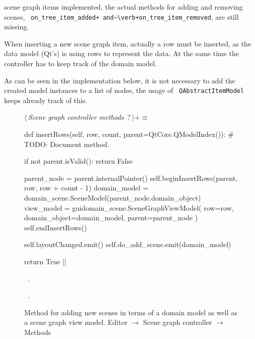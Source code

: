 \documentclass[%
    a4paper,    %
    justified,  %
    nobib,      %
    openany     %
]{tufte-book}
\begin{document}
 scene
graph items implemented, the actual methods for adding and removing scenes,
~\verb=on_tree_item_added+ and~\verb+on_tree_item_removed=, are still missing.

When inserting a new scene graph item, actually a row must be inserted, as the
data model (Qt's) is using rows to represent the data. At the same time the
controller has to keep track of the domain model.

As can be seen in the implementation below, it is not necessary to add the
created model instances to a list of nodes, the usage of
~\verb=QAbstractItemModel= keeps already track of this.

\begin{figure}
\begin{flushleft} \small
\begin{minipage}{\linewidth}\label{scrap51}\raggedright\small
{} $\langle\,${\itshape Scene graph controller methods}\nobreak\ {\footnotesize {?}}$\,\rangle+\equiv$
\vspace{-1ex}
\begin{pythoncode}
def insertRows(self, row, count, parent=QtCore.QModelIndex()):
    # TODO: Document method.

    if not parent.isValid():
        return False

    parent_node = parent.internalPointer()
    self.beginInsertRows(parent, row, row + count - 1)
    domain_model  = domain_scene.SceneModel(parent_node.domain_object)
    view_model = guidomain_scene.SceneGraphViewModel(
        row=row,
        domain_object=domain_model,
        parent=parent_node
    )
    self.endInsertRows()

    self.layoutChanged.emit()
    self.do_add_scene.emit(domain_model)

    return True
|\NWsep|
\end{pythoncode}
\vspace{1.5ex}
\footnotesize
\begin{list}{}{\setlength{\itemsep}{-\parsep}\setlength{\itemindent}{-\leftmargin}}
\item \NWtxtMacroDefBy\ .
\item \NWtxtMacroRefIn\ .

\item{}
\end{list}
\end{minipage}\vspace{4ex}
\end{flushleft}
\caption{Method for adding new scenes in terms of a domain model as well as a
  scene graph view model.
  \newline{}\newline{}Editor $\rightarrow$ Scene graph controller
  $\rightarrow$ Methods}
\label{editor:lst:scene-graph-controller:methods:insert-rows}
\end{figure}
\end{document}
